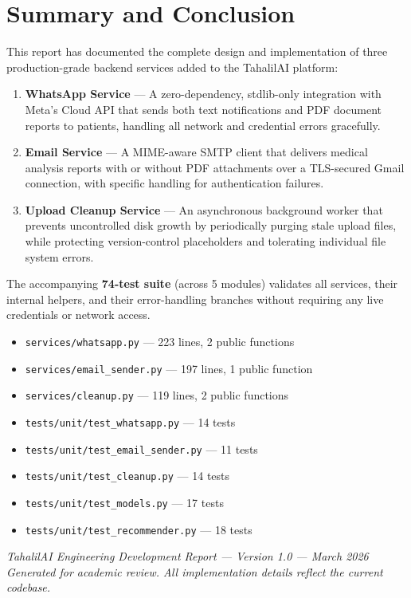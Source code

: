 \documentclass[12pt, a4paper]{article}
\newcommand{\file}[1]{\texttt{\color{accent}#1}}
\begin{document}
\section{Summary and Conclusion}

This report has documented the complete design and implementation of three
production-grade backend services added to the TahalilAI platform:

\begin{enumerate}[leftmargin=*, itemsep=5pt]
  \item \textbf{WhatsApp Service} — A zero-dependency, stdlib-only integration
        with Meta's Cloud API that sends both text notifications and PDF
        document reports to patients, handling all network and credential errors
        gracefully.
  \item \textbf{Email Service} — A MIME-aware SMTP client that delivers medical
        analysis reports with or without PDF attachments over a TLS-secured
        Gmail connection, with specific handling for authentication failures.
  \item \textbf{Upload Cleanup Service} — An asynchronous background worker
        that prevents uncontrolled disk growth by periodically purging stale
        upload files, while protecting version-control placeholders and
        tolerating individual file system errors.
\end{enumerate}

The accompanying \textbf{74-test suite} (across 5 modules) validates all
services, their internal helpers, and their error-handling branches without
requiring any live credentials or network access.

\begin{successbox}[title={Deliverables Completed}]
  \begin{itemize}[leftmargin=*, itemsep=3pt, topsep=0pt]
    \item[\checkmark] \file{services/whatsapp.py} — 223 lines, 2 public functions
    \item[\checkmark] \file{services/email\_sender.py} — 197 lines, 1 public function
    \item[\checkmark] \file{services/cleanup.py} — 119 lines, 2 public functions
    \item[\checkmark] \file{tests/unit/test\_whatsapp.py} — 14 tests
    \item[\checkmark] \file{tests/unit/test\_email\_sender.py} — 11 tests
    \item[\checkmark] \file{tests/unit/test\_cleanup.py} — 14 tests
    \item[\checkmark] \file{tests/unit/test\_models.py} — 17 tests
    \item[\checkmark] \file{tests/unit/test\_recommender.py} — 18 tests
  \end{itemize}
\end{successbox}

\vspace{1cm}
\begin{center}
  \color{midgray}\small
  \textit{TahalilAI Engineering Development Report — Version 1.0 — March 2026}\\
  \textit{Generated for academic review. All implementation details reflect the current codebase.}
\end{center}
\end{document}
